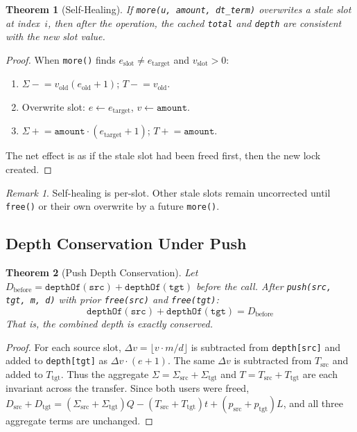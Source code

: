 \documentclass[10pt,a4paper,twocolumn]{article}
\theoremstyle{definition}
\theoremstyle{plain}
\newtheorem{theorem}{Theorem}[section]
\theoremstyle{remark}
\newtheorem{remark}{Remark}[section]
\begin{document}
\begin{theorem}[Self-Healing]
\label{thm:self-healing}
If \texttt{more(u, amount, dt\_term)} overwrites a stale slot at index~$i$, then after the operation, the cached \texttt{total} and \texttt{depth} are consistent with the new slot value.
\end{theorem}

\begin{proof}
When \texttt{more()} finds $e_{\text{slot}} \neq e_{\text{target}}$ and $v_{\text{slot}} > 0$:
\begin{enumerate}[nosep]
\item $\Sigma \mathrel{-}= v_{\text{old}}(e_{\text{old}}{+}1)$; $T \mathrel{-}= v_{\text{old}}$.
\item Overwrite slot: $e \leftarrow e_{\text{target}}$, $v \leftarrow \texttt{amount}$.
\item $\Sigma \mathrel{+}= \texttt{amount} \cdot (e_{\text{target}}{+}1)$; $T \mathrel{+}= \texttt{amount}$.
\end{enumerate}
The net effect is as if the stale slot had been freed first, then the new lock created.
\end{proof}

\begin{remark}
Self-healing is per-slot. Other stale slots remain uncorrected until \texttt{free()} or their own overwrite by a future \texttt{more()}.
\end{remark}

\subsection{Depth Conservation Under Push}

\begin{theorem}[Push Depth Conservation]
\label{thm:push-conservation}
Let $D_{\text{before}} = \texttt{depthOf}(\texttt{src}) + \texttt{depthOf}(\texttt{tgt})$ before the call. After \texttt{push(src, tgt, m, d)} with prior \texttt{free(src)} and \texttt{free(tgt)}:
\[
\texttt{depthOf}(\texttt{src}) + \texttt{depthOf}(\texttt{tgt}) = D_{\text{before}}
\]
That is, the combined depth is exactly conserved.
\end{theorem}

\begin{proof}
For each source slot, $\Delta v = \lfloor v \cdot m/d \rfloor$ is subtracted from \texttt{depth[src]} and added to \texttt{depth[tgt]} as $\Delta v \cdot (e{+}1)$. The same $\Delta v$ is subtracted from $T_{\text{src}}$ and added to $T_{\text{tgt}}$. Thus the aggregate $\Sigma = \Sigma_{\text{src}} + \Sigma_{\text{tgt}}$ and $T = T_{\text{src}} + T_{\text{tgt}}$ are each invariant across the transfer. Since both users were freed, $D_{\text{src}} + D_{\text{tgt}} = (\Sigma_{\text{src}} + \Sigma_{\text{tgt}})Q - (T_{\text{src}} + T_{\text{tgt}})t + (p_{\text{src}} + p_{\text{tgt}})L$, and all three aggregate terms are unchanged.
\end{proof}
\end{document}
